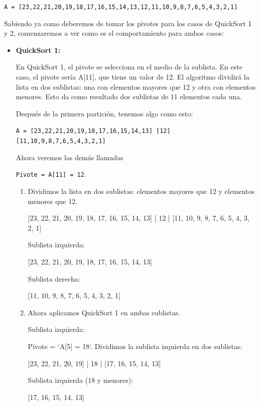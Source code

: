 \documentclass[answers, 11pt]{exam}
\begin{document}
\begin{questions}
\begin{solution}
\begin{center}
  \verb|A = [23,22,21,20,19,18,17,16,15,14,13,12,11,10,9,8,7,6,5,4,3,2,1]|
\end{center}

Sabiendo ya como deberemos de tomar los pivotes para los casos de QuickSort 1 y 2, 
comenzaremos a ver como es el comportamiento para ambos casos:

\begin{itemize}
  \item \textbf{QuickSort 1:}
  
  En QuickSort 1, el pivote se selecciona en el medio de la sublista. En este caso, 
  el pivote sería A[11], que tiene un valor de 12. El algoritmo dividirá la lista 
  en dos sublistas: una con elementos mayores que 12 y otra con elementos menores. 
  Esto da como resultado dos sublistas de 11 elementos cada una.

  Después de la primera partición, tenemos algo como esto:
  \begin{center}
    \verb|A = [23,22,21,20,19,18,17,16,15,14,13] [12] [11,10,9,8,7,6,5,4,3,2,1]|
  \end{center}

  Ahora veremos las demás llamadas

  \verb|Pivote = A[11] = 12|. 
  
  \begin{enumerate}
    \item Dividimos la lista en dos sublistas: elementos mayores que 12 y elementos menores que 12.

    [23, 22, 21, 20, 19, 18, 17, 16, 15, 14, 13] | 12 | [11, 10, 9, 8, 7, 6, 5, 4, 3, 2, 1]
  
    Sublista izquierda:
  
    
    [23, 22, 21, 20, 19, 18, 17, 16, 15, 14, 13]
    
  
    Sublista derecha:
  
    
    [11, 10, 9, 8, 7, 6, 5, 4, 3, 2, 1]
    
  
  \item Ahora aplicamos QuickSort 1 en ambas sublistas.
  
    Sublista izquierda:
  
    Pivote = `A[5] = 18`. Dividimos la sublista izquierda en dos sublistas:
    
    [23, 22, 21, 20, 19] | 18 | [17, 16, 15, 14, 13]
  
    Sublista izquierda (18 y menores):
    
    [17, 16, 15, 14, 13]  
  

\end{enumerate}
\end{itemize}
\end{solution}
\end{questions}
\end{document}
